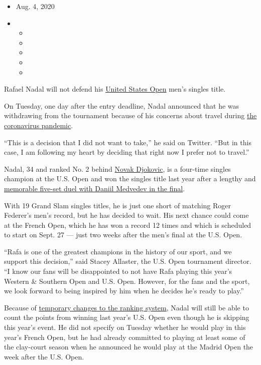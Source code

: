 \begin{itemize}
\item
  Aug. 4, 2020
\item
  \begin{itemize}
  \item
  \item
  \item
  \item
  \item
  \end{itemize}
\end{itemize}

Rafael Nadal will not defend his
\href{https://www.nytimes3xbfgragh.onion/2020/06/16/sports/us-open-tennis-cuomo.html}{United
States Open} men's singles title.

On Tuesday, one day after the entry deadline, Nadal announced that he
was withdrawing from the tournament because of his concerns about travel
during
\href{https://www.nytimes3xbfgragh.onion/news-event/coronavirus}{the
coronavirus pandemic}.

``This is a decision that I did not want to take,'' he said on Twitter.
``But in this case, I am following my heart by deciding that right now I
prefer not to travel.''

Nadal, 34 and ranked No. 2 behind
\href{https://www.nytimes3xbfgragh.onion/2020/06/23/sports/tennis/novak-djokovic-coronavirus.html}{Novak
Djokovic}, is a four-time singles champion at the U.S. Open and won the
singles title last year after a lengthy and
\href{https://www.nytimes3xbfgragh.onion/2019/09/08/sports/tennis/us-open-rafael-nadal-daniil-medvedev.html}{memorable
five-set duel with Daniil Medvedev in the final}.

With 19 Grand Slam singles titles, he is just one short of matching
Roger Federer's men's record, but he has decided to wait. His next
chance could come at the French Open, which he has won a record 12 times
and which is scheduled to start on Sept. 27 --- just two weeks after the
men's final at the U.S. Open.

``Rafa is one of the greatest champions in the history of our sport, and
we support this decision,'' said Stacey Allaster, the U.S. Open
tournament director. ``I know our fans will be disappointed to not have
Rafa playing this year's Western \& Southern Open and U.S. Open.
However, for the fans and the sport, we look forward to being inspired
by him when he decides he's ready to play.''

Because of
\href{https://www.nytimes3xbfgragh.onion/2020/07/04/sports/tennis/tennis-rankings-coronavirus.html}{temporary
changes to the ranking system}, Nadal will still be able to count the
points from winning last year's U.S. Open even though he is skipping
this year's event. He did not specify on Tuesday whether he would play
in this year's French Open, but he had already committed to playing at
least some of the clay-court season when he announced he would play at
the Madrid Open the week after the U.S. Open.

